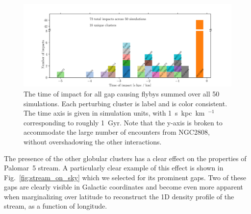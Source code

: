 \documentclass[draft]{aa}
\begin{document}
    \begin{figure}
      \centering
      \includegraphics[width=\linewidth]{histogram_impact_time.png}
      \caption{The time of impact for all gap causing flybys summed over all 50 simulations. Each perturbing cluster is label and is color consistent. The time axis is given in simulation units, with 1~s~kpc~km~$^{-1}$ corresponding to roughly 1~Gyr. Note that the y-axis is broken to accommodate the large number of encounters from NGC2808, without overshadowing the other interactions.}
      \label{fig:histogram_impact_time}
    \end{figure}

    
    The presence of the other globular clusters has a clear effect on the properties of Palomar~5 stream. A particularly clear example of this effect is shown in Fig.~\ref{fig:stream_on_sky} which we selected for its prominent gaps. Two of these gaps are clearly visible in Galactic coordinates and become even more apparent when marginalizing over latitude to reconstruct the 1D density profile of the stream, as a function of longitude.     
\end{document}
